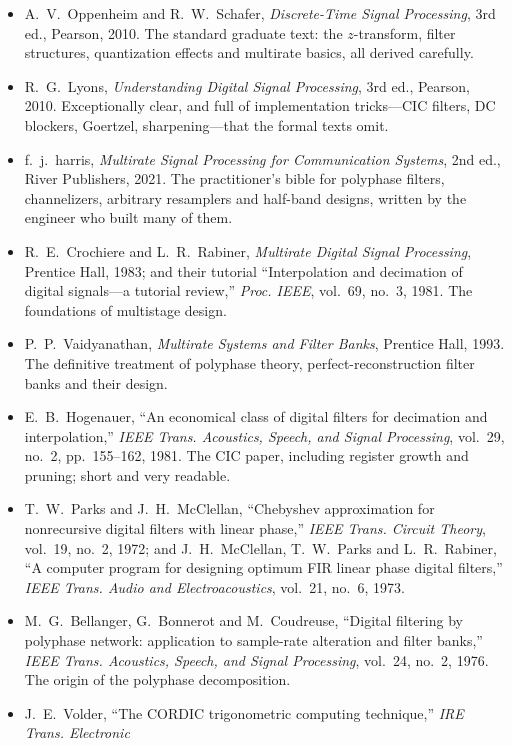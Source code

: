 \furtherreading
\begin{itemize}
\item A.~V.~Oppenheim and R.~W.~Schafer, \emph{Discrete-Time Signal Processing}, 3rd ed., Pearson,
2010. The standard graduate text: the $z$-transform, filter structures, quantization effects and
multirate basics, all derived carefully.
\item R.~G.~Lyons, \emph{Understanding Digital Signal Processing}, 3rd ed., Pearson, 2010. Exceptionally
clear, and full of implementation tricks---CIC filters, DC blockers, Goertzel, sharpening---that the
formal texts omit.
\item f.~j.~harris, \emph{Multirate Signal Processing for Communication Systems}, 2nd ed., River
Publishers, 2021. The practitioner's bible for polyphase filters, channelizers, arbitrary resamplers
and half-band designs, written by the engineer who built many of them.
\item R.~E.~Crochiere and L.~R.~Rabiner, \emph{Multirate Digital Signal Processing}, Prentice Hall,
1983; and their tutorial ``Interpolation and decimation of digital signals---a tutorial review,''
\emph{Proc. IEEE}, vol.~69, no.~3, 1981. The foundations of multistage design.
\item P.~P.~Vaidyanathan, \emph{Multirate Systems and Filter Banks}, Prentice Hall, 1993. The definitive
treatment of polyphase theory, perfect-reconstruction filter banks and their design.
\item E.~B.~Hogenauer, ``An economical class of digital filters for decimation and interpolation,''
\emph{IEEE Trans. Acoustics, Speech, and Signal Processing}, vol.~29, no.~2, pp.~155--162, 1981. The CIC
paper, including register growth and pruning; short and very readable.
\item T.~W.~Parks and J.~H.~McClellan, ``Chebyshev approximation for nonrecursive digital filters with
linear phase,'' \emph{IEEE Trans. Circuit Theory}, vol.~19, no.~2, 1972; and J.~H.~McClellan,
T.~W.~Parks and L.~R.~Rabiner, ``A computer program for designing optimum FIR linear phase digital
filters,'' \emph{IEEE Trans. Audio and Electroacoustics}, vol.~21, no.~6, 1973.
\item M.~G.~Bellanger, G.~Bonnerot and M.~Coudreuse, ``Digital filtering by polyphase network:
application to sample-rate alteration and filter banks,'' \emph{IEEE Trans. Acoustics, Speech, and
Signal Processing}, vol.~24, no.~2, 1976. The origin of the polyphase decomposition.
\item J.~E.~Volder, ``The CORDIC trigonometric computing technique,'' \emph{IRE Trans. Electronic
}
\end{itemize}
